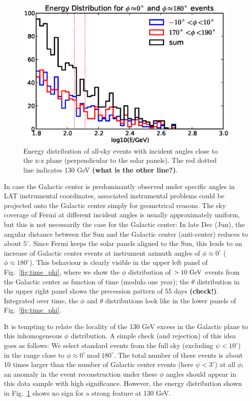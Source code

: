 \documentclass[aps,twocolumn,prd,superscriptaddress,showpacs,nofootinbib,fixfloat]{revtex4}
\newcommand{\GeV}{{\rm ~GeV}}
\begin{document}
\begin{figure}
\centering
\includegraphics[width=1.0\linewidth]{plots/phi_energy.eps}
\caption{Energy distribution of all-sky events with incident angles close to
the x-z plane (perpendicular to the solar panels). The red dotted line
indicates 130 GeV \textbf{(what is the other line?)}.}
\label{fig:spectrum_phi}
\end{figure}

In case the Galactic center is predominantly observed under specific angles in
LAT instrumental coordinates, associated instrumental problems could be
projected onto the Galactic center simply for geometrical reasons. The sky
coverage of Fermi at different incident angles is usually approximately uniform,
but this is not necessarily the case for the Galactic center: In late Dec
(Jun), the angular distance between the Sun and the Galactic center
(anti-center) reduces to about $5^\circ$.  Since Fermi keeps the solar panels
aligned to the Sun, this leads to an increase of Galactic center events at
instrument azimuth angles of $\phi\approx 0^\circ$ ($\phi\approx 180^\circ$).
This behaviour is clearly visible in the upper left panel of Fig.~\ref{fig:time_phi}, where we show
the $\phi$ distribution of $>10\GeV$ events from the Galactic center as
function of time (modulo one year); the $\theta$ distribution in the upper
right panel shows the precession pattern of 55 days \textbf{(check!)}.
Integrated over time, the $\phi$ and $\theta$ distributions look like in the
lower panels of Fig.~\ref{fig:time_phi}.

It is tempting to relate the locality of the 130 GeV excess in the Galactic
plane to this inhomogeneous $\phi$ distribution. A simple check (and
rejection) of this idea goes as follows: We select standard events from the
full sky (excluding $\psi < 10^\circ$) in the range close to $\phi\approx
0^\circ\ \text{mod}\ 180^\circ$. The total number of these events is about 10
times larger than the number of Galactic center events (here $\psi<3^\circ$)
at all $\phi$; an anomaly in the event reconstruction under these $\phi$
angles should appear in this data sample with high significance. However, the
energy distribution shown in Fig.~\ref{fig:spectrum_phi} shows no sign for a
strong feature at 130 GeV.
\end{document}
